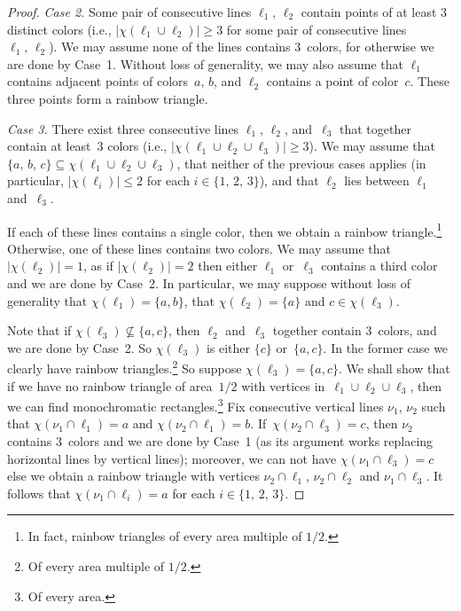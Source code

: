 \documentclass[a4paper, 11pt,reqno]{amsart}
\theoremstyle{definition}
\begin{document}
{\begin{proof}
      \medskip
      \emph{Case 2.} Some pair of consecutive lines $\ell_1,\, \ell_2$ contain points of at least $3$ distinct
colors
      (i.e., $\bigl|\chi(\ell_1\cup\ell_2)\bigr|\ge 3$ for some pair of consecutive lines~$\ell_1,\,\ell_2$).
      We may assume none of the lines contains 3~colors, for otherwise we are done by Case~1.
      Without loss of generality, we may also assume that $\ell_1$ contains adjacent points of colors~$a,\,b$,
      and $\ell_2$ contains a point of color~$c$. These three points form a rainbow triangle.

      \medskip
      \emph{Case 3.} There exist three consecutive lines $\ell_1,\,\ell_2$, and~$\ell_3$ that
      together contain at least~$3$ colors
      (i.e., $\bigl|\chi(\ell_1\cup\ell_2\cup\ell_3)\bigr|\ge 3$).
      We may assume that $\{a,\,b,\,c\}\subseteq \chi(\ell_1\cup\ell_2\cup\ell_3)$, that neither
      of the previous cases applies (in particular, $\bigl|\chi(\ell_i)\bigr|\le 2$ for each $i\in\{1,\,2,\,3\}$),
      and that $\ell_2$ lies between $\ell_1$ and~$\ell_3$.

      If each of these lines contains a single color, then we obtain a rainbow triangle.\footnote{{In fact,
      rainbow triangles of every  area multiple of $1/2$}.}
      Otherwise, one of these lines contains two colors.
      We may assume that $\bigl|\chi(\ell_2)\bigr|=1$, %
      as if $\bigl|\chi(\ell_2)\bigr|=2$ then either $\ell_1$ or~$\ell_3$ contains
      a third color and we are done by Case~2.
      In particular, we may suppose without loss of generality that $\chi(\ell_1)=\{a,b\}$, that $\chi(\ell_2)=\{a\}$ and $c\in\chi(\ell_3)$.

      Note that if $\chi(\ell_3)\not\subseteq \{a,c\}$,
      then $\ell_2$ and~$\ell_3$ together contain 3~colors, and we are done by Case~2.
      So $\chi(\ell_3)$ is either $\{c\}$ or~$\{a,c\}$. In the former case we clearly
      have rainbow triangles.\footnote{{Of every  area multiple of $1/2$.}}
      So suppose $\chi(\ell_3)=\{a,c\}$.
      We shall show that if we have no rainbow triangle of area~$1/2$ with vertices in~$\ell_1\cup\ell_2\cup\ell_3$,
      then we can find monochromatic rectangles.\footnote{Of every area.}
      Fix consecutive vertical lines $\nu_1$, $\nu_2$ such that $\chi(\nu_1\cap\ell_1)=a$ and $\chi(\nu_2\cap\ell_1)=b$.
      If~$\chi(\nu_2\cap \ell_3)=c$, then $\nu_2$ contains 3~colors and we are done by Case~1 (as its argument
      works replacing horizontal lines by vertical lines); moreover, we can not have $\chi(\nu_1\cap \ell_3)=c$ else we
      obtain a rainbow triangle with vertices {$\nu_2\cap\ell_1$, $\nu_2\cap \ell_2$} and $\nu_1\cap \ell_3$.
      It follows that {$\chi(\nu_1\cap\ell_i)=a$} for each $i\in\{1,\,2,\,3\}$.


\end{proof}}
\end{document}
